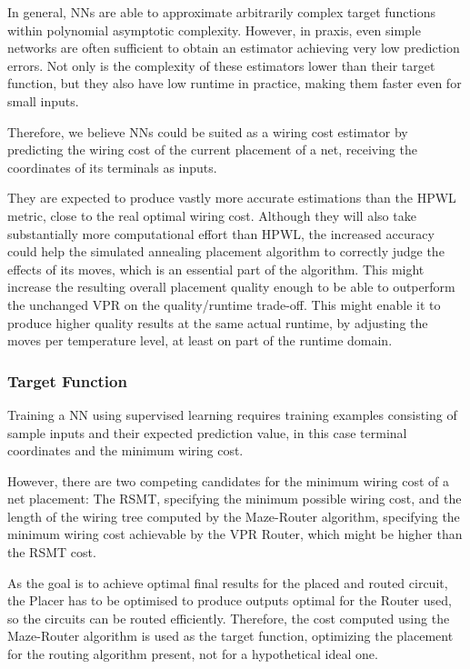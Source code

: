 In general, \glspl{NN} are able to approximate arbitrarily complex target functions\cite{universial-approx-web} within polynomial asymptotic complexity\cite{NN-complexity-web}. However, in praxis, even simple networks are often sufficient to obtain an estimator achieving very low prediction errors. Not only is the complexity of these estimators lower than their target function, but they also have low runtime in practice, making them faster even for small inputs.

Therefore, we believe \glspl{NN} could be suited as a wiring cost estimator by predicting the wiring cost of the current placement of a net, receiving the coordinates of its terminals as inputs. 

They are expected to produce vastly more accurate estimations than the \gls{HPWL} metric, close to the real optimal wiring cost. Although they will also take substantially more computational effort than \gls{HPWL}, the increased accuracy could help the simulated annealing placement algorithm to correctly judge the effects of its moves, which is an essential part of the algorithm. This might increase the resulting overall placement quality enough to be able to outperform the unchanged \gls{VPR} on the quality/runtime trade-off. This might enable it to produce higher quality results at the same actual runtime, by adjusting the moves per temperature level, at least on part of the runtime domain.

\subsubsection{Target Function}

Training a \gls{NN} using supervised learning requires training examples consisting of sample inputs and their expected prediction value, in this case terminal coordinates and the minimum wiring cost.

However, there are two competing candidates for the minimum wiring cost of a net placement: The \gls{RSMT}, specifying the minimum possible wiring cost, and the length of the wiring tree computed by the Maze-Router algorithm\cite{Maze-Router}, specifying the minimum wiring cost achievable by the \gls{VPR} Router, which might be higher than the \gls{RSMT} cost.

As the goal is to achieve optimal final results for the placed and routed circuit, the Placer has to be optimised to produce outputs optimal for the Router used, so the circuits can be routed efficiently. Therefore, the cost computed using the Maze-Router algorithm is used as the target function, optimizing the placement for the routing algorithm present, not for a hypothetical ideal one.

